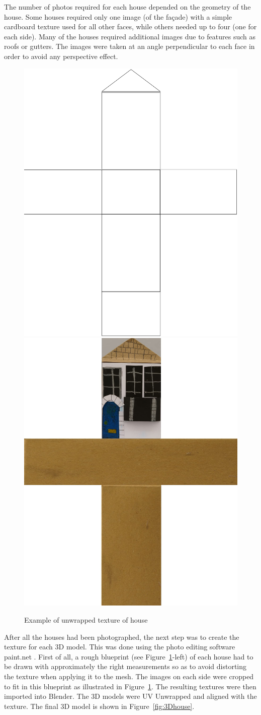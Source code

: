 \documentclass[acmlarge,screen,dvipsnames]{acmart}
\begin{document}
 The number of photos required for each house depended on the geometry of the
 house. Some houses required only one image (of the fa\c{c}ade) with a simple
 cardboard texture used for all other faces, while others needed up to four
 (one for each side). Many of the houses required additional images due to
 features such as roofs or gutters. The images were taken at an angle
 perpendicular to each face in order to avoid any perspective effect. 

 \begin{figure}[ht] \centering
\includegraphics[width=0.49\linewidth]{images/za_tex_template.png}
\includegraphics[width=0.49\linewidth]{images/za_tex.jpg}
\caption{Example of unwrapped texture of house} \label{fig:pattern}
\end{figure}


After all the houses had been photographed, the next step was to create the
texture for each 3D model. This was done using the photo editing software
paint.net \cite{paintnet}. First of all, a rough blueprint (see
Figure~\ref{fig:pattern}-left) of each house had to be drawn with
approximately the right measurements so as to avoid distorting the texture
when applying it to the mesh. The images on each side were cropped to fit in
this blueprint as illustrated in Figure~\ref{fig:pattern}. The resulting
textures were then imported into Blender. The 3D models were UV Unwrapped and
aligned with the texture. The final 3D model is shown in
Figure~\ref{fig:3Dhouse}. 
\end{document}
